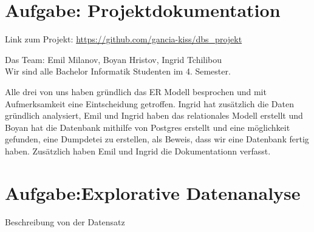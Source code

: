 \usepackage{graphicx}

\newcommand{\dozent}{Prof.  Dr.  Agnès Voisard, Nicolas Lehmann}					%
\newcommand{\tutor}{Hoffman Christian}						%
\newcommand{\tutoriumNo}{Tutorium 3}				%
\newcommand{\projectNo}{1}									%
\newcommand{\veranstaltung}{Datenbank Systeme}	%
\newcommand{\semester}{SoeSe 2017}						%
\newcommand{\studenten}{IngridTchilibou,Emil,Boyan Hristov}			%





\section{Aufgabe: Projektdokumentation}
Link zum Projekt: \url{https://github.com/gancia-kiss/dbs_projekt}

Das Team: Emil Milanov, Boyan Hristov, Ingrid Tchilibou\\
Wir sind alle Bachelor Informatik Studenten im 4. Semester.

Alle drei von uns haben gründlich das ER Modell besprochen und mit Aufmerksamkeit eine Eintscheidung getroffen. Ingrid hat zusätzlich die Daten gründlich analysiert, Emil und Ingrid haben das relationales Modell erstellt und Boyan hat die Datenbank mithilfe von Postgres erstellt und eine möglichkeit gefunden, eine Dumpdetei zu erstellen, als Beweis, dass wir eine Datenbank fertig haben. Zusätzlich haben Emil und Ingrid die Dokumentationn verfasst.



\section{Aufgabe:Explorative Datenanalyse}
Beschreibung von der Datensatz

